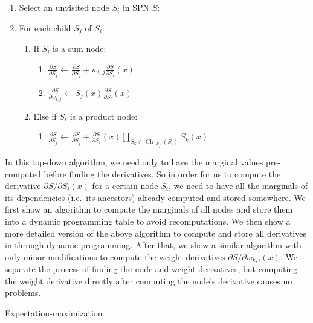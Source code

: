 \documentclass{amsart}
\makeatletter
\def\subsection{\@startsection{subsection}{3}%
  \z@{.5\linespacing\@plus.7\linespacing}{.1\linespacing}%
  {\normalfont}}
\DeclareMathOperator*{\Ch}{\text{Ch}}
\theoremstyle{plain}
\numberwithin{equation}{section}
\newcommand{\ddspn}[2]{\frac{\partial#1}{\partial#2}}
\makeatother
\begin{document}
\begin{enumerate}[label=\arabic*.]
  \item Select an unvisited node $S_i$ in SPN $S$:
  \item For each child $S_j$ of $S_i$:
    \begin{enumerate}[label*=\arabic*.]
      \item If $S_i$ is a sum node:
        \begin{enumerate}[label*=\arabic*.]
          \item $\ddspn{S}{S_j}\gets\ddspn{S}{S_j}+w_{i,j}\ddspn{S}{S_i}(x)$
          \item $\ddspn{S}{w_{i,j}}\gets S_j(x)\ddspn{S}{S_i}(x)$
        \end{enumerate}
      \item Else if $S_i$ is a product node:
        \begin{enumerate}[label*=\arabic*]
          \item $\ddspn{S}{S_j}\gets\ddspn{S}{S_j}+\ddspn{S}{S_i}(x)\prod_{S_k\in\Ch_{-S_j}(S_i)}
            S_k(x)$
        \end{enumerate}
    \end{enumerate}
\end{enumerate}

In this top-down algorithm, we need only to have the marginal values pre-computed before finding
the derivatives. So in order for us to compute the derivative $\partial S/\partial S_i(x)$ for a
certain node $S_i$, we need to have all the marginals of its dependencies (i.e.\
its ancestors) already computed and stored somewhere. We first show an algorithm to compute the
marginals of all nodes and store them into a dynamic programming table to avoid recomputations. We
then show a more detailed version of the above algorithm to compute and store all derivatives in
through dynamic programming. After that, we show a similar algorithm with only minor modifications
to compute the weight derivatives $\partial S/\partial w_{k,i}(x)$. We separate the process of
finding the node and weight derivatives, but computing the weight derivative directly after
computing the node's derivative causes no problems.

\subsection{Expectation-maximization}


\printbibliography[]
\end{document}
